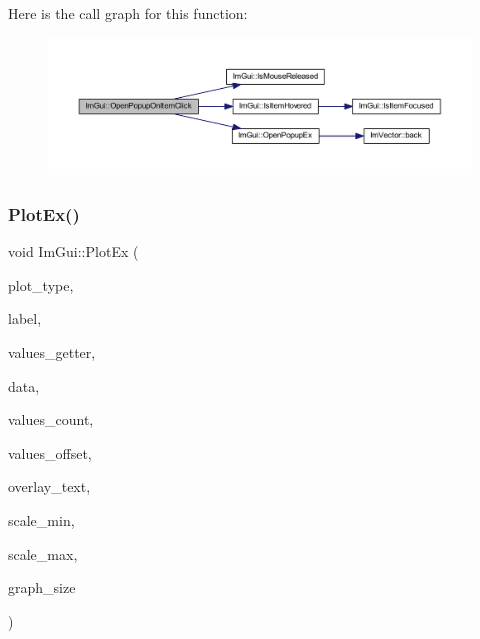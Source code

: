Here is the call graph for this function\+:
\nopagebreak
\begin{figure}[H]
\begin{center}
\leavevmode
\includegraphics[width=350pt]{namespace_im_gui_a546fc46d8f510cb17a2f272891e2f5b3_cgraph}
\end{center}
\end{figure}
\mbox{\label{namespace_im_gui_a0a18ae07b294d5667f95a5c003d2efb6}} 
\subsubsection{\texorpdfstring{Plot\+Ex()}{PlotEx()}}
{\footnotesize\ttfamily void Im\+Gui\+::\+Plot\+Ex (\begin{DoxyParamCaption}\item[{\mbox{\hyperlink{imgui__internal_8h_a9d5efcdd8895aa3544f1e8ce366c2728}{Im\+Gui\+Plot\+Type}}}]{plot\+\_\+type,  }\item[{const char $\ast$}]{label,  }\item[{float($\ast$)(void $\ast$data, int idx)}]{values\+\_\+getter,  }\item[{void $\ast$}]{data,  }\item[{int}]{values\+\_\+count,  }\item[{int}]{values\+\_\+offset,  }\item[{const char $\ast$}]{overlay\+\_\+text,  }\item[{float}]{scale\+\_\+min,  }\item[{float}]{scale\+\_\+max,  }\item[{\mbox{\hyperlink{struct_im_vec2}{Im\+Vec2}}}]{graph\+\_\+size }\end{DoxyParamCaption})}

